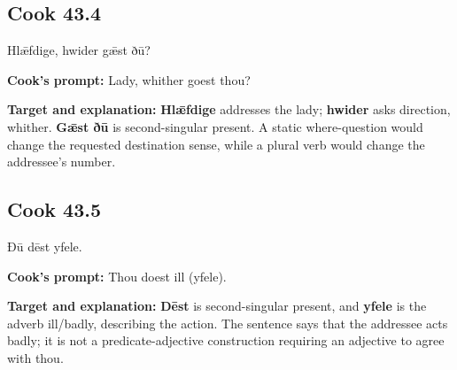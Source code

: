 \par\begin{minipage}{\linewidth}\raggedright
\subsection*{Cook 43.4}

Hlǣfdige, hwider gǣst ðū?

\textbf{Cook's prompt:} Lady, whither goest thou?

\textbf{Target and explanation:} \textbf{Hlǣfdige} addresses the lady; \textbf{hwider} asks direction, whither. \textbf{Gǣst ðū} is second-singular present. A static where-question would change the requested destination sense, while a plural verb would change the addressee's number.

\end{minipage}\par\addvspace{4pt}

\par\begin{minipage}{\linewidth}\raggedright
\subsection*{Cook 43.5}

Ðū dēst yfele.

\textbf{Cook's prompt:} Thou doest ill (yfele).

\textbf{Target and explanation:} \textbf{Dēst} is second-singular present, and \textbf{yfele} is the adverb ill/\allowbreak{}badly, describing the action. The sentence says that the addressee acts badly; it is not a predicate-adjective construction requiring an adjective to agree with thou.

\end{minipage}\par\addvspace{4pt}


